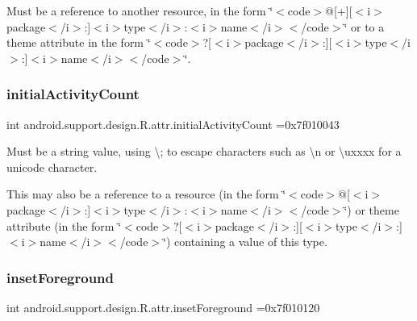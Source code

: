 Must be a reference to another resource, in the form \char`\"{}$<$code$>$@\mbox{[}+\mbox{]}\mbox{[}$<$i$>$package$<$/i$>$\+:\mbox{]}$<$i$>$type$<$/i$>$\+:$<$i$>$name$<$/i$>$$<$/code$>$\char`\"{} or to a theme attribute in the form \char`\"{}$<$code$>$?\mbox{[}$<$i$>$package$<$/i$>$\+:\mbox{]}\mbox{[}$<$i$>$type$<$/i$>$\+:\mbox{]}$<$i$>$name$<$/i$>$$<$/code$>$\char`\"{}. \mbox{\label{classandroid_1_1support_1_1design_1_1R_1_1attr_a169175309f22c90214d396ce178fe3dc}} 
\subsubsection{\texorpdfstring{initial\+Activity\+Count}{initialActivityCount}}
{\footnotesize\ttfamily int android.\+support.\+design.\+R.\+attr.\+initial\+Activity\+Count =0x7f010043\hspace{0.3cm}{\ttfamily [static]}}

Must be a string value, using \textquotesingle{}\textbackslash{};\textquotesingle{} to escape characters such as \textquotesingle{}\textbackslash{}n\textquotesingle{} or \textquotesingle{}\textbackslash{}uxxxx\textquotesingle{} for a unicode character. 

This may also be a reference to a resource (in the form \char`\"{}$<$code$>$@\mbox{[}$<$i$>$package$<$/i$>$\+:\mbox{]}$<$i$>$type$<$/i$>$\+:$<$i$>$name$<$/i$>$$<$/code$>$\char`\"{}) or theme attribute (in the form \char`\"{}$<$code$>$?\mbox{[}$<$i$>$package$<$/i$>$\+:\mbox{]}\mbox{[}$<$i$>$type$<$/i$>$\+:\mbox{]}$<$i$>$name$<$/i$>$$<$/code$>$\char`\"{}) containing a value of this type. \mbox{\label{classandroid_1_1support_1_1design_1_1R_1_1attr_aab326e4395fb0655ef08dc1f6502462b}} 
\subsubsection{\texorpdfstring{inset\+Foreground}{insetForeground}}
{\footnotesize\ttfamily int android.\+support.\+design.\+R.\+attr.\+inset\+Foreground =0x7f010120\hspace{0.3cm}{\ttfamily [static]}}

